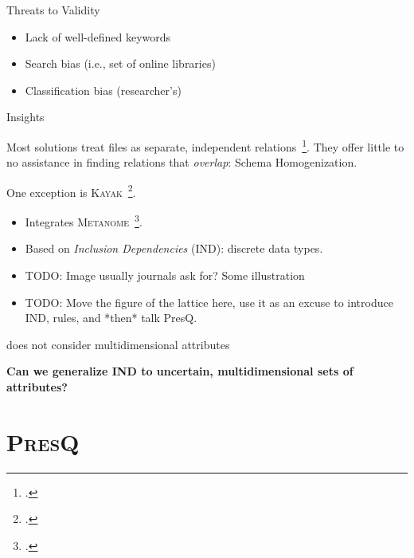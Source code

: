 \documentclass[10pt]{beamer}
\newcommand{\PresQ}[0]{\textsc{PresQ}\xspace}
\begin{document}
\begin{frame}{Threats to Validity}
\begin{itemize}
    \item Lack of well-defined keywords
    \item Search bias (i.e., set of online libraries)
    \item Classification bias (researcher's)
\end{itemize}
\end{frame}

\begin{frame}{Insights}
    \begin{block}{}
        Most solutions treat files as separate, independent relations~\footcite{Silva2016}. They offer
        little to no assistance in finding relations that \textit{overlap}: \alert{Schema Homogenization}.
    \end{block}
    \begin{block}{}
        One exception is \textsc{Kayak}~\footcite{maccioni_crossing_2017}.
        \begin{itemize}
            \item Integrates \textsc{Metanome}~\footcite{papenbrock2015data}.
            \item Based on \emph{Inclusion Dependencies} (IND): discrete data types.
            \item TODO: Image usually journals ask for? Some illustration
            \item TODO: Move the figure of the lattice here, use it as an excuse to introduce IND, rules, and *then* talk PresQ.
        \end{itemize}
    \end{block}
    \begin{block}{}
        \cite{alawini2016} does not consider multidimensional attributes
    \end{block}
    \alert{\textbf{Can we generalize IND to uncertain, multidimensional sets of attributes?}}
\end{frame}

\section{\PresQ}

\end{document}
